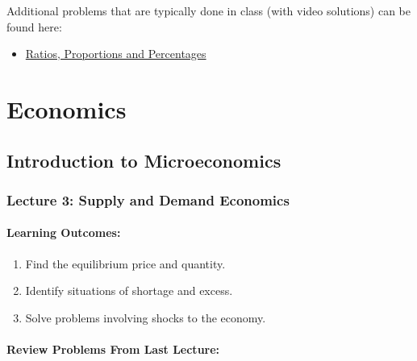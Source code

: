 \documentclass[
]{book}
\providecommand{\tightlist}{%
  \setlength{\itemsep}{0pt}\setlength{\parskip}{0pt}}
\begin{document}
Additional problems that are typically done in class (with video solutions) can be found here:

\begin{itemize}
\tightlist
\item
  \href{https://theelementsmath.github.io/M114/preliminaries.html\#ratios-proportions-and-percentages}{Ratios, Proportions and Percentages}
\end{itemize}

\part{Economics}\label{part-economics}

\chapter{Introduction to Microeconomics}\label{introduction-to-microeconomics}

\section*{Lecture 3: Supply and Demand Economics}\label{lecture-3-supply-and-demand-economics}

\subsection*{Learning Outcomes:}\label{learning-outcomes-2}

\begin{enumerate}
\def\labelenumi{\arabic{enumi}.}
\tightlist
\item
  Find the equilibrium price and quantity.
\item
  Identify situations of shortage and excess.
\item
  Solve problems involving shocks to the economy.
\end{enumerate}

\subsection*{Review Problems From Last Lecture:}\label{review-problems-from-last-lecture-1}
\end{document}
